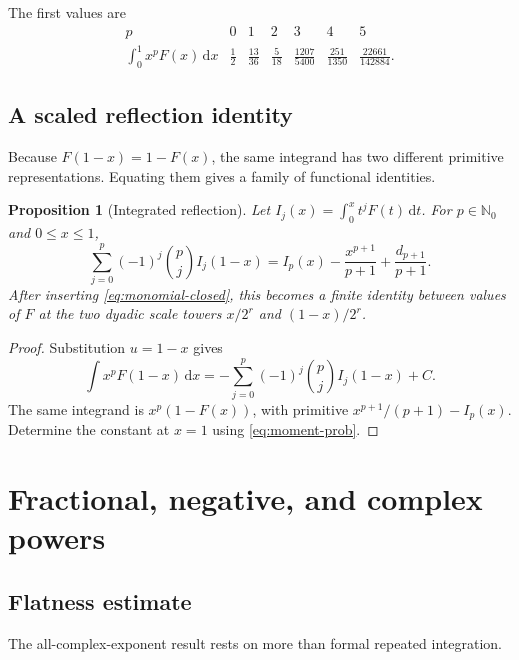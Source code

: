 \documentclass[11pt,oneside]{article}
\numberwithin{equation}{section}
\newtheorem{proposition}[theorem]{Proposition}
\theoremstyle{definition}
\theoremstyle{remark}
\newcommand{\N}{\mathbb N}
\newcommand{\dd}{\,\mathrm d}
\begin{document}
The first values are
\begin{equation}
\begin{array}{c|cccccc}
 p&0&1&2&3&4&5\\ \hline
 \displaystyle\int_0^1x^pF(x)\dd x
 &\frac12&\frac{13}{36}&\frac5{18}&\frac{1207}{5400}
 &\frac{251}{1350}&\frac{22661}{142884}.
\end{array}                                                \label{eq:first-moments-table}
\end{equation}

\subsection{A scaled reflection identity}
Because $F(1-x)=1-F(x)$, the same integrand has two different primitive
representations.  Equating them gives a family of functional identities.

\begin{proposition}[Integrated reflection]
\label{prop:integrated-reflection}
Let $I_j(x)=\int_0^xt^jF(t)\dd t$.  For $p\in\N_0$ and $0\le x\le1$,
\begin{equation}
 \boxed{
 \sum_{j=0}^{p}(-1)^j\binom pj I_j(1-x)
 =I_p(x)-\frac{x^{p+1}}{p+1}+\frac{d_{p+1}}{p+1}.}         \label{eq:integrated-reflection}
\end{equation}
After inserting \eqref{eq:monomial-closed}, this becomes a finite identity
between values of $F$ at the two dyadic scale towers
$x/2^r$ and $(1-x)/2^r$.
\end{proposition}

\begin{proof}
Substitution $u=1-x$ gives
\[
 \int x^pF(1-x)\dd x
 =-\sum_{j=0}^{p}(-1)^j\binom pjI_j(1-x)+C.
\]
The same integrand is $x^p(1-F(x))$, with primitive
$x^{p+1}/(p+1)-I_p(x)$.  Determine the constant at $x=1$ using
\eqref{eq:moment-prob}.
\end{proof}

\section{Fractional, negative, and complex powers}
\label{sec:complex-powers}

\subsection{Flatness estimate}
The all-complex-exponent result rests on more than formal repeated integration.
\end{document}
